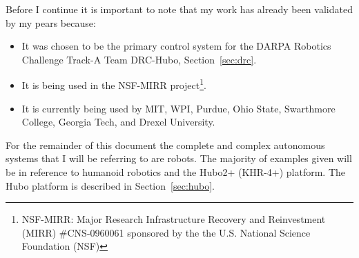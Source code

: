 Before I continue it is important to note that my work has already been validated by my pears because:
\begin{itemize}
\item It was chosen to be the primary control system for the DARPA Robotics Challenge Track-A Team DRC-Hubo, Section~\ref{sec:drc}.
\item It is being used in the NSF-MIRR project\footnote{NSF-MIRR: Major Research Infrastructure Recovery and Reinvestment (MIRR) \#CNS-0960061 sponsored by the the U.S. National Science Foundation (NSF)}.
\item It is currently being used by MIT, WPI, Purdue, Ohio State, Swarthmore College, Georgia Tech, and Drexel University.
\end{itemize}

For the remainder of this document the complete and complex autonomous systems that I will be referring to are robots.
The majority of examples given will be in reference to humanoid robotics and the Hubo2+ (KHR-4+) platform.
The Hubo platform is described in Section~\ref{sec:hubo}.




